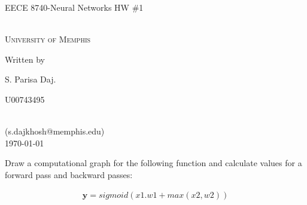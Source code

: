 \documentclass[12pt,oneside,geqno]{article}
\begin{document}
	
	\begin{center}
		{\LARGE EECE 8740-Neural Networks HW \#1}%
		\vspace*{1\baselineskip}   
		
		\scshape %
		\color{red}{(Solutions)}\\
		\vspace*{1\baselineskip}
		\color{black}University of Memphis\\[\baselineskip]
		\vspace*{5\baselineskip} 
		
		Written by \\[\baselineskip]
		{\Large S. Parisa Daj.\par U00743495} \\
		(s.dajkhosh@memphis.edu)\\
		
		\vspace*{1\baselineskip}
		\today
	\end{center}
	\clearpage
	
	
	\begin{Problem}[a]
		Draw a computational graph for the following function and calculate values for
		a forward pass and backward passes: 
		
		\begin{align}
			\mathbf{y} = sigmoid(x1.w1 + max(x2, w2))
		\end{align}
	\end{Problem}
	
\end{document}
